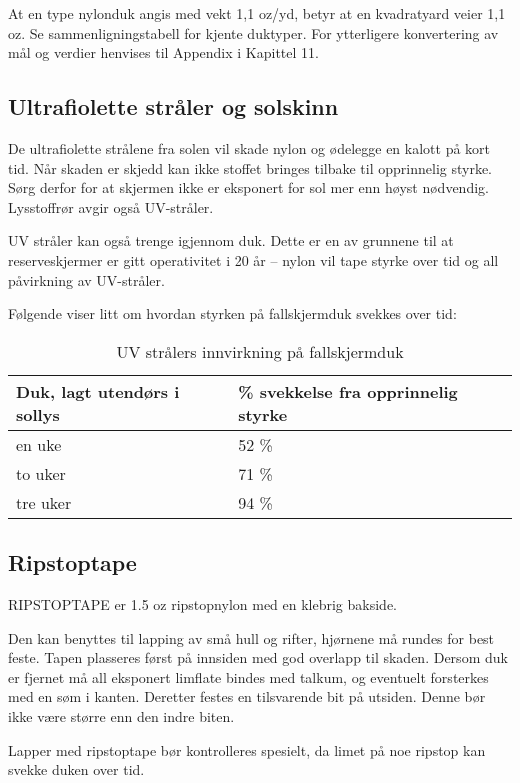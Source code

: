 At en type nylonduk angis med vekt 1,1 oz/yd, betyr at en kvadratyard veier 1,1 oz. Se sammenligningstabell for kjente duktyper. For ytterligere konvertering av mål og verdier henvises til Appendix i Kapittel 11.

\subsection{Ultrafiolette stråler og solskinn}
De ultrafiolette strålene fra solen vil skade nylon og ødelegge en kalott på kort tid. Når skaden er skjedd kan ikke stoffet bringes tilbake til opprinnelig styrke. Sørg derfor for at skjermen ikke er eksponert for sol mer enn høyst nødvendig. Lysstoffrør avgir også UV-stråler.

UV stråler kan også trenge igjennom duk. Dette er en av grunnene til at reserveskjermer er gitt operativitet i 20 år – nylon vil tape styrke over tid og all påvirkning av UV-stråler.

Følgende viser litt om hvordan styrken på fallskjermduk svekkes over tid:

\begin{table}
	\caption{UV strålers innvirkning på fallskjermduk}
	\begin{tabular}{ | l | l | }
		\hline
		Duk, lagt utendørs i sollys & \% svekkelse fra opprinnelig styrke \\
		\hline
		en uke & 52 \% \\
		\hline
		to uker & 71 \% \\
		\hline
		tre uker & 94 \% \\
		\hline
	\end{tabular}
\end{table}

\subsection{Ripstoptape}
RIPSTOPTAPE er 1.5 oz ripstopnylon med en klebrig bakside.

Den kan benyttes til lapping av små hull og rifter, hjørnene må rundes for best feste. Tapen plasseres først på innsiden med god overlapp til skaden. Dersom duk er fjernet må all eksponert limflate bindes med talkum, og eventuelt forsterkes med en søm i kanten. Deretter festes en tilsvarende bit på utsiden. Denne bør ikke være større enn den indre biten.

Lapper med ripstoptape bør kontrolleres spesielt, da limet på noe ripstop kan svekke duken over tid.


